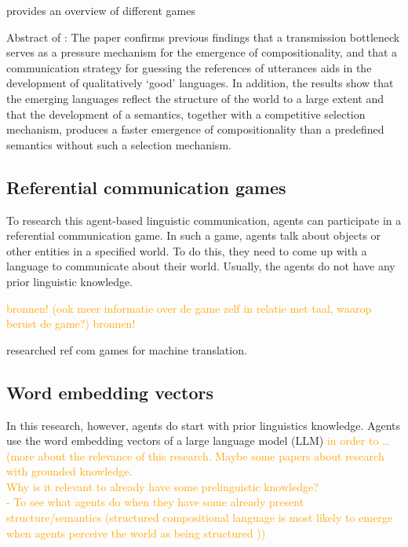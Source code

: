 \documentclass[a4paper, 12pt]{report}
\begin{document}
 provides an overview of different games

Abstract of \cite{VogtPaul2005Teoc}: The paper confirms previous findings that a transmission bottleneck serves as a pressure mechanism for the emergence of compositionality, and that a communication strategy for guessing the references of utterances aids in the development of qualitatively ‘good’ languages. In addition, the results show that the emerging languages reflect the structure of the world to a large extent and that the development of a semantics, together with a competitive selection mechanism, produces a faster emergence of compositionality than a predefined semantics without such a selection mechanism.

\subsection{Referential communication games}
To research this agent-based linguistic communication, agents can participate in a referential communication game. 
In such a game, agents talk about objects or other entities in a specified world.
To do this, they need to come up with a language to communicate about their world. 
Usually, the agents do not have any prior linguistic knowledge.

\textcolor{orange}{bronnen! (ook meer informatie over de game zelf in relatie met taal, waarop berust de game?)}
\textcolor{orange}{bronnen!} 

 researched ref com games for machine translation.

\subsection{Word embedding vectors}
In this research, however, agents do start with prior linguistics knowledge. 
Agents use the word embedding vectors of a large language model (LLM) \textcolor{orange}{in order to \dots (more about the relevance of this research. Maybe some papers about research with grounded knowledge. \\ Why is it relevant to already have some prelinguistic knowledge? \\ - To see what agents do when they have some already present structure/semantics (structured compositional language is most likely to emerge when agents perceive the world as being structured \cite{LazaridouAngeliki2018EoLC}))}
\end{document}
